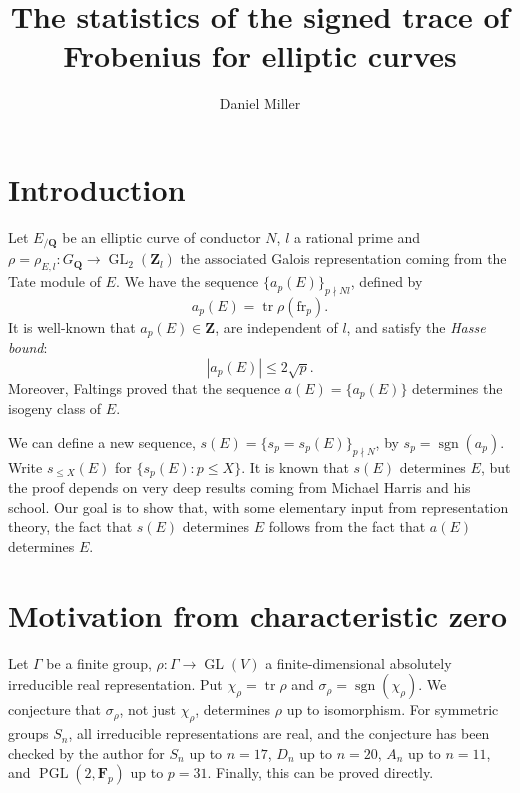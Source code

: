 \documentclass{article}
\title{The statistics of the signed trace of Frobenius for elliptic curves}
\author{Daniel Miller}
\DeclareMathOperator{\GL}{GL}
\DeclareMathOperator{\PGL}{PGL}
\DeclareMathOperator{\sign}{sgn}
\DeclareMathOperator{\trace}{tr}
\newcommand{\bF}{\mathbf{F}}
\newcommand{\bQ}{\mathbf{Q}}
\newcommand{\bZ}{\mathbf{Z}}
\newcommand{\frob}{\mathrm{fr}}
\numberwithin{theorem}{section}
\begin{document}
\maketitle





\section{Introduction}

Let $E_{/\bQ}$ be an elliptic curve of conductor $N$, $l$ a rational prime and 
$\rho=\rho_{E,l}\colon G_\bQ\to \GL_2(\bZ_l)$ the associated Galois 
representation coming from the Tate module of $E$. We have the sequence 
$\{a_p(E)\}_{p\nmid N l}$, defined by 
\[
	a_p(E) = \trace \rho(\frob_p) .
\]
It is well-known that $a_p(E)\in \bZ$, are independent of $l$, and satisfy 
the \emph{Hasse bound}:
\[
	|a_p(E)| \leqslant 2\sqrt p .
\]
Moreover, Faltings proved that the sequence $a(E) = \{a_p(E)\}$ determines the 
isogeny class of $E$. 

We can define a new sequence, $s(E) = \{s_p=s_p(E)\}_{p\nmid N}$, by 
$s_p = \sign(a_p)$. Write $s_{\leqslant X}(E)$ for 
$\{s_p(E)\colon p\leqslant X\}$. It is known that $s(E)$ determines $E$, but 
the proof depends on very deep results coming from Michael Harris 
and his school. Our goal is to show that, with some elementary input from 
representation theory, the fact that $s(E)$ determines $E$ follows from the 
fact that $a(E)$ determines $E$. 





\section{Motivation from characteristic zero}

Let $\Gamma$ be a finite group, $\rho\colon \Gamma\to \GL(V)$ a 
finite-dimensional absolutely irreducible real representation. Put 
$\chi_\rho=\trace\rho$ and $\sigma_\rho = \sign(\chi_\rho)$. We conjecture that 
$\sigma_\rho$, not just $\chi_\rho$,  determines $\rho$ up to isomorphism. For 
symmetric groups $S_n$, all irreducible representations are real, and the 
conjecture has been checked by the author for $S_n$ up to $n=17$, $D_n$ up 
to $n=20$, $A_n$ up to $n=11$, and $\PGL(2,\bF_p)$ up to $p=31$. Finally, this 
can be proved directly. 
\end{document}
